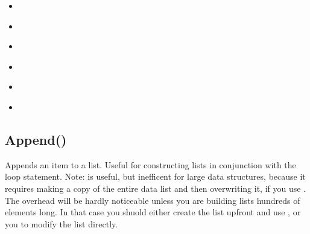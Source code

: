 \documentclass[letterpaper,10pt,english]{sphinxmanual}
\begin{document}
\begin{sphinxShadowBox}
\begin{itemize}
\item {} 
\sphinxAtStartPar
{}\label{\detokenize{reference/pebllist:id22}}{\hyperref[\detokenize{reference/pebllist:setelement}]{}}

\item {} 
\sphinxAtStartPar
{}\label{\detokenize{reference/pebllist:id23}}{\hyperref[\detokenize{reference/pebllist:shuffle}]{}}

\item {} 
\sphinxAtStartPar
{}\label{\detokenize{reference/pebllist:id24}}{\hyperref[\detokenize{reference/pebllist:sort}]{}}

\item {} 
\sphinxAtStartPar
{}\label{\detokenize{reference/pebllist:id25}}{\hyperref[\detokenize{reference/pebllist:sortby}]{}}

\item {} 
\sphinxAtStartPar
{}\label{\detokenize{reference/pebllist:id26}}{\hyperref[\detokenize{reference/pebllist:sublist}]{}}

\item {} 
\sphinxAtStartPar
{}\label{\detokenize{reference/pebllist:id27}}{\hyperref[\detokenize{reference/pebllist:transpose}]{}}

\end{itemize}
\end{sphinxShadowBox}

\ignorespaces 

\subsection{Append()}
\label{\detokenize{reference/pebllist:append}}\label{\detokenize{reference/pebllist:index-0}}
\sphinxAtStartPar
{}

\sphinxAtStartPar
Appends an item to a list.  Useful for constructing lists in conjunction with the loop statement.  Note:  is useful, but inefficent for large data structures, because it requires making a copy of the entire data list and then overwriting it, if you use .  The overhead will be hardly noticeable unless you are building lists hundreds of elements long.  In that case you shuold either create the list upfront and use , or you  to modify the list directly.
\end{document}
